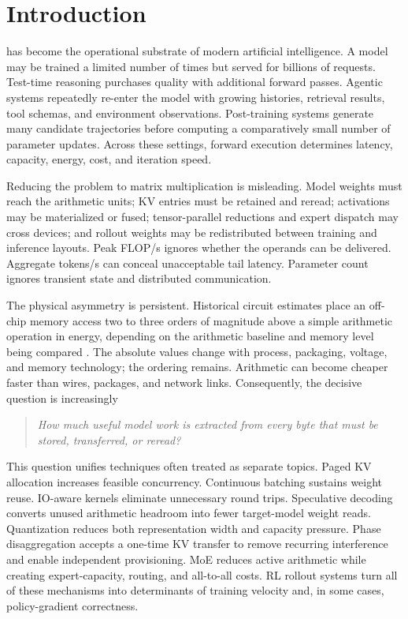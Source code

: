 \documentclass[journal]{IEEEtran}
\begin{document}
\section{Introduction}
 has become the operational substrate of modern artificial intelligence. A model may be trained a limited number of times but served for billions of requests. Test-time reasoning purchases quality with additional forward passes. Agentic systems repeatedly re-enter the model with growing histories, retrieval results, tool schemas, and environment observations. Post-training systems generate many candidate trajectories before computing a comparatively small number of parameter updates. Across these settings, forward execution determines latency, capacity, energy, cost, and iteration speed.

Reducing the problem to matrix multiplication is misleading. Model weights must reach the arithmetic units; KV entries must be retained and reread; activations may be materialized or fused; tensor-parallel reductions and expert dispatch may cross devices; and rollout weights may be redistributed between training and inference layouts. Peak FLOP/s ignores whether the operands can be delivered. Aggregate tokens/s can conceal unacceptable tail latency. Parameter count ignores transient state and distributed communication.

The physical asymmetry is persistent. Historical circuit estimates place an off-chip memory access two to three orders of magnitude above a simple arithmetic operation in energy, depending on the arithmetic baseline and memory level being compared \cite{horowitz2014energy}. The absolute values change with process, packaging, voltage, and memory technology; the ordering remains. Arithmetic can become cheaper faster than wires, packages, and network links. Consequently, the decisive question is increasingly
\begin{quote}
\emph{How much useful model work is extracted from every byte that must be stored, transferred, or reread?}
\end{quote}

This question unifies techniques often treated as separate topics. Paged KV allocation increases feasible concurrency. Continuous batching sustains weight reuse. IO-aware kernels eliminate unnecessary round trips. Speculative decoding converts unused arithmetic headroom into fewer target-model weight reads. Quantization reduces both representation width and capacity pressure. Phase disaggregation accepts a one-time KV transfer to remove recurring interference and enable independent provisioning. MoE reduces active arithmetic while creating expert-capacity, routing, and all-to-all costs. RL rollout systems turn all of these mechanisms into determinants of training velocity and, in some cases, policy-gradient correctness.
\end{document}
